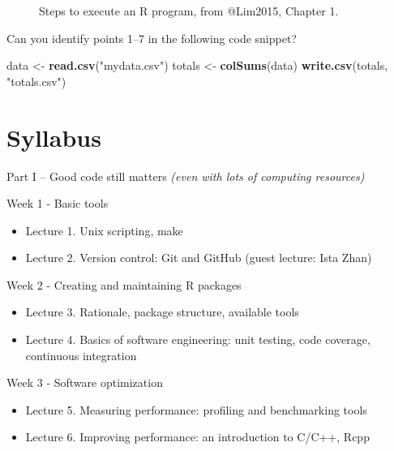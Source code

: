 \documentclass[]{book}
\newenvironment{Shaded}{\begin{snugshade}}{\end{snugshade}}
\newcommand{\KeywordTok}[1]{\textcolor[rgb]{0.13,0.29,0.53}{\textbf{#1}}}
\newcommand{\StringTok}[1]{\textcolor[rgb]{0.31,0.60,0.02}{#1}}
\newcommand{\NormalTok}[1]{#1}
\providecommand{\tightlist}{%
  \setlength{\itemsep}{0pt}\setlength{\parskip}{0pt}}
\theoremstyle{definition}
\theoremstyle{definition}
\theoremstyle{definition}
\theoremstyle{remark}
\let\BeginKnitrBlock\begin \let\EndKnitrBlock\end
\begin{document}
\begin{figure}
{}

\caption{Steps to execute an R program, from @Lim2015, Chapter 1.}\label{fig:bottlenecks}
\end{figure}

\BeginKnitrBlock{exercise}
\protect\hypertarget{exr:unnamed-chunk-1}{}{\label{exr:unnamed-chunk-1} }Can
you identify points 1--7 in the following code snippet?
\EndKnitrBlock{exercise}

\begin{Shaded}
\begin{Highlighting}[]
\NormalTok{data <-}\StringTok{ }\KeywordTok{read.csv}\NormalTok{(}\StringTok{"mydata.csv"}\NormalTok{)}
\NormalTok{totals <-}\StringTok{ }\KeywordTok{colSums}\NormalTok{(data)}
\KeywordTok{write.csv}\NormalTok{(totals, }\StringTok{"totals.csv"}\NormalTok{)}
\end{Highlighting}
\end{Shaded}

\section{Syllabus}\label{syllabus}

Part I -- Good code still matters \emph{(even with lots of computing
resources)}

Week 1 - Basic tools

\begin{itemize}
\tightlist
\item
  Lecture 1. Unix scripting, make
\item
  Lecture 2. Version control: Git and GitHub (guest lecture: Ista Zhan)
\end{itemize}

Week 2 - Creating and maintaining R packages

\begin{itemize}
\tightlist
\item
  Lecture 3. Rationale, package structure, available tools
\item
  Lecture 4. Basics of software engineering: unit testing, code
  coverage, continuous integration
\end{itemize}

Week 3 - Software optimization

\begin{itemize}
\tightlist
\item
  Lecture 5. Measuring performance: profiling and benchmarking tools
\item
  Lecture 6. Improving performance: an introduction to C/C++, Rcpp
\end{itemize}
\end{document}
